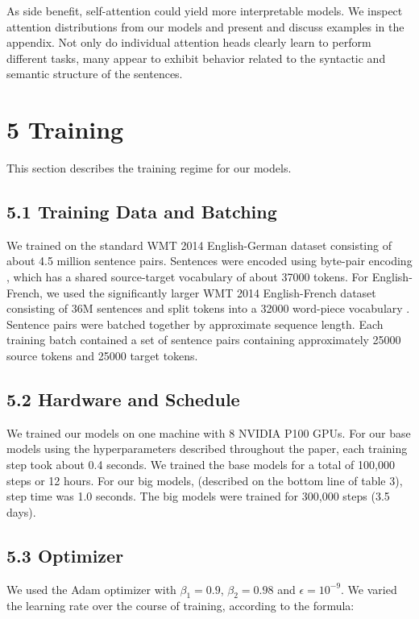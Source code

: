\documentclass[12pt, a4paper]{article}
\begin{document}
As side benefit, self-attention could yield more interpretable models. We inspect attention distributions from our models and present and discuss examples in the appendix. Not only do individual attention heads clearly learn to perform different tasks, many appear to exhibit behavior related to the syntactic and semantic structure of the sentences.

\section{5 Training}

This section describes the training regime for our models.

\subsection{5.1 Training Data and Batching}

We trained on the standard WMT 2014 English-German dataset consisting of about 4.5 million sentence pairs. Sentences were encoded using byte-pair encoding \cite{ref3}, which has a shared source-target vocabulary of about 37000 tokens. For English-French, we used the significantly larger WMT 2014 English-French dataset consisting of 36M sentences and split tokens into a 32000 word-piece vocabulary \cite{ref38}. Sentence pairs were batched together by approximate sequence length. Each training batch contained a set of sentence pairs containing approximately 25000 source tokens and 25000 target tokens.

\subsection{5.2 Hardware and Schedule}

We trained our models on one machine with 8 NVIDIA P100 GPUs. For our base models using the hyperparameters described throughout the paper, each training step took about 0.4 seconds. We trained the base models for a total of 100,000 steps or 12 hours. For our big models, (described on the bottom line of table 3), step time was 1.0 seconds. The big models were trained for 300,000 steps (3.5 days).

\subsection{5.3 Optimizer}

We used the Adam optimizer \cite{ref20} with $\beta_1 = 0.9$, $\beta_2 = 0.98$ and $\epsilon = 10^{-9}$. We varied the learning rate over the course of training, according to the formula:
\end{document}

